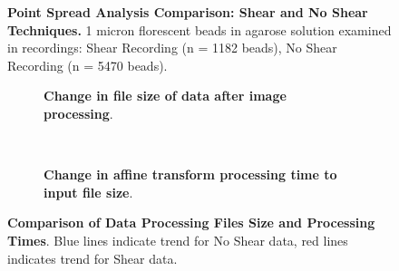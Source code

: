 \begin{figure}[H]
    \label{fig:enter-label}
    \caption{\textbf{Point Spread Analysis Comparison: Shear and No Shear Techniques.} 1 micron florescent beads in agarose solution examined in recordings: Shear Recording (n = 1182 beads), No Shear Recording (n = 5470 beads).}
\end{figure}

\begin{figure}[H]
    \centering
        \begin{subfigure}[t]{0.4\textwidth}
        \centering
        \caption{\textbf{Change in file size of data after image processing}.}
        \label{fig:enter-label}
        \end{subfigure}
        \hspace{2em}
        ~
        \begin{subfigure}[t]{0.4\textwidth}
        \centering
        \caption{\textbf{Change in affine transform processing time to input file size}.}
        \label{fig:enter-label}
        \end{subfigure}
    \caption{\textbf{Comparison of Data Processing Files Size and Processing Times}. Blue lines indicate trend for No Shear data, red lines indicates trend for Shear data.}
    \label{fig:enter-label}
\end{figure}

